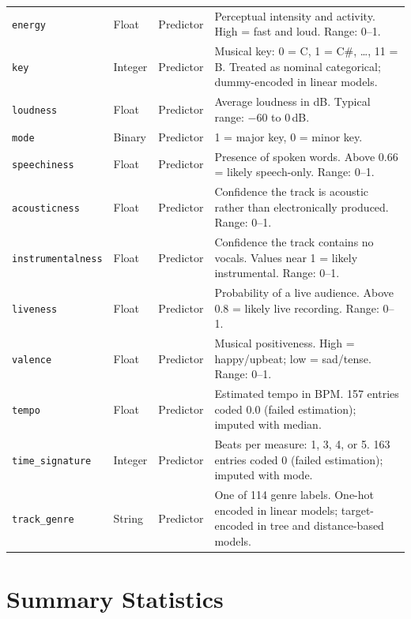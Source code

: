 \documentclass[12pt, oneside]{book}
\begin{document}
\begin{longtable}{p{3.0cm} p{1.6cm} p{1.8cm} p{7.8cm}}
\texttt{energy}            & Float   & Predictor                           & Perceptual intensity and activity. High = fast and loud. Range: 0--1. \\
\texttt{key}               & Integer & Predictor                           & Musical key: 0 = C, 1 = C\#, \ldots, 11 = B. Treated as nominal categorical; dummy-encoded in linear models. \\
\texttt{loudness}          & Float   & Predictor                           & Average loudness in dB. Typical range: $-60$ to 0\,dB. \\
\texttt{mode}              & Binary  & Predictor                           & 1 = major key, 0 = minor key. \\
\texttt{speechiness}       & Float   & Predictor                           & Presence of spoken words. Above 0.66 = likely speech-only. Range: 0--1. \\
\texttt{acousticness}      & Float   & Predictor                           & Confidence the track is acoustic rather than electronically produced. Range: 0--1. \\
\texttt{instrumentalness}  & Float   & Predictor                           & Confidence the track contains no vocals. Values near 1 = likely instrumental. Range: 0--1. \\
\texttt{liveness}          & Float   & Predictor                           & Probability of a live audience. Above 0.8 = likely live recording. Range: 0--1. \\
\texttt{valence}           & Float   & Predictor                           & Musical positiveness. High = happy/upbeat; low = sad/tense. Range: 0--1. \\
\texttt{tempo}             & Float   & Predictor                           & Estimated tempo in BPM. 157 entries coded 0.0 (failed estimation); imputed with median. \\
\texttt{time\_signature}   & Integer & Predictor                           & Beats per measure: 1, 3, 4, or 5. 163 entries coded 0 (failed estimation); imputed with mode. \\
\texttt{track\_genre}      & String  & Predictor                           & One of 114 genre labels. One-hot encoded in linear models; target-encoded in tree and distance-based models. \\
\end{longtable}
 
\section{Summary Statistics}
 
\end{document}
